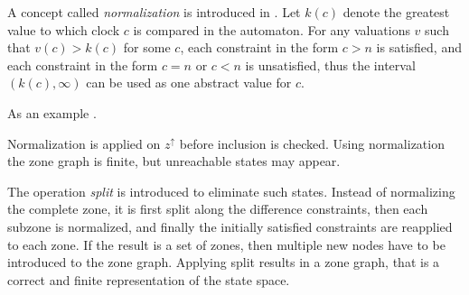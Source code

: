 A concept called \emph{normalization} is introduced in \cite{bengtsson2004timed}.
Let $k(c)$ denote the greatest value to which clock $c$ is compared in the automaton.
For any valuations $v$ such that $v(c)>k(c)$ for some $c$, each constraint in the form $c > n$ is satisfied, and each constraint in the form $c = n$ or $c < n$ is unsatisfied, thus the interval $(k(c),\infty)$ can be used as one abstract value for $c$.

As an example .

Normalization is applied on $z^\uparrow$ before inclusion is checked.
Using normalization the zone 
graph is finite, but unreachable states may appear. 

The operation \emph{split} \cite{bengtsson2004timed} is introduced to eliminate such states. Instead of
normalizing the complete zone, it is first split along the difference constraints,
then each subzone is normalized, and finally the initially satisfied constraints are reapplied to each zone. If the result is a set of zones, then multiple new nodes have to be introduced to the zone graph. Applying split results in a zone
graph, that is a correct and finite representation of the state space.



